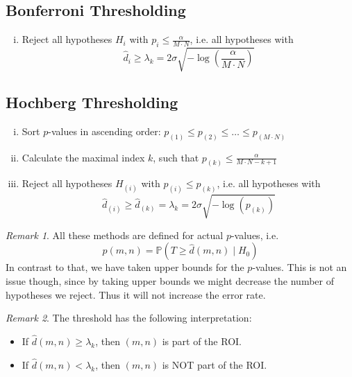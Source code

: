 \documentclass[a4paper,12pt]{article}
\theoremstyle{plain}
\theoremstyle{definition}
\theoremstyle{remark}
\newtheorem{remark}{Remark}
\begin{document}
\subsection{Bonferroni Thresholding}
\begin{enumerate}[(i)]
	\item Reject all hypotheses $H_{i}$ with $p_{i} \leq \frac{\alpha}{M \cdot N}$, i.e. all hypotheses with $$\hat{d}_{i} \geq \lambda_k = 2 \sigma \sqrt{- \log \left( \frac{\alpha}{M \cdot N} \right)}$$
\end{enumerate}

\subsection{Hochberg Thresholding}
\begin{enumerate}[(i)]
	\item Sort $p$-values in ascending order: $p_{(1)} \leq p_{(2)} \leq \dots \leq p_{(M \cdot N)}$
	\item Calculate the maximal index $k$, such that $p_{(k)} \leq \frac{\alpha}{M \cdot N - k + 1}$
	\item Reject all hypotheses $H_{(i)}$ with $p_{(i)} \leq p_{(k)}$, i.e. all hypotheses with $$\hat{d}_{(i)} \geq \hat{d}_{(k)} = \lambda_{k} = 2 \sigma \sqrt{- \log(p_{(k)})}$$
\end{enumerate}

\begin{remark}
	All these methods are defined for actual $p$-values, i.e.
	\begin{equation*}
		p(m, n) = \mathbb{P}(T \geq \hat{d}(m, n) \mid H_0)
	\end{equation*}
	In contrast to that, we have taken upper bounds for the $p$-values. This is not an issue though, since by taking upper bounds we might decrease the number of hypotheses we reject. Thus it will not increase the error rate.
\end{remark}

\begin{remark}
	The threshold has the following interpretation:
	\begin{itemize}
		\item If $\hat{d}(m, n) \geq \lambda_{k}$, then $(m, n)$ is part of the ROI.
		\item If $\hat{d}(m, n) < \lambda_{k}$, then $(m, n)$ is NOT part of the ROI.
	\end{itemize}
\end{remark}

\newpage
\end{document}
